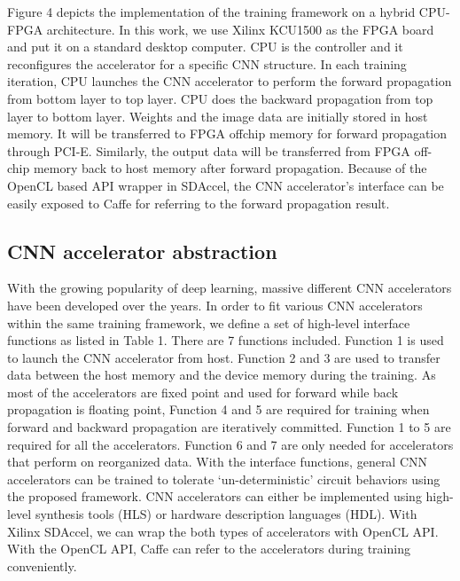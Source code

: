 Figure 4 depicts the implementation of the training framework on a hybrid 
CPU-FPGA architecture. In this work, we use Xilinx KCU1500 as the FPGA board 
and put it on a standard desktop computer. CPU is the controller and it reconfigures 
the accelerator for a specific CNN structure. In each training iteration, CPU launches 
the CNN accelerator to perform the forward propagation from bottom layer to top layer. 
CPU does the backward propagation from top layer to bottom layer. Weights and the image 
data are initially stored in host memory. It will be transferred to FPGA offchip memory 
for forward propagation through PCI-E. Similarly, the output data will be transferred 
from FPGA off-chip memory back to host memory after forward propagation. Because of the 
OpenCL based API wrapper in SDAccel, the CNN accelerator’s interface can be easily 
exposed to Caffe for referring to the forward propagation result. 



\subsection{CNN accelerator abstraction}
  With the growing popularity of deep learning, massive different 
CNN accelerators have been developed over the years. In order to fit various CNN accelerators 
within the same training framework, we define a set of high-level interface functions as listed 
in Table 1. There are 7 functions included. Function 1 is used to launch the CNN accelerator from host. 
Function 2 and 3 are used to transfer data between the host memory and the device memory during 
the training. As most of the accelerators are fixed point and used for forward while back propagation 
is floating point, Function 4 and 5 are required for training when forward and backward 
propagation are iteratively committed. Function 1 to 5 are required for all the accelerators. 
Function 6 and 7 are only needed for accelerators that perform on reorganized data\cite{pipecnn_2,deepburing_12}. 
With the interface functions, general CNN accelerators can be trained to tolerate ‘un-deterministic’ circuit 
behaviors using the proposed framework.
  CNN accelerators can either be implemented using high-level synthesis tools (HLS) or hardware description 
languages (HDL). With Xilinx SDAccel, we can wrap the both types of accelerators with OpenCL API. 
With the OpenCL API, Caffe can refer to the accelerators during training conveniently. 

